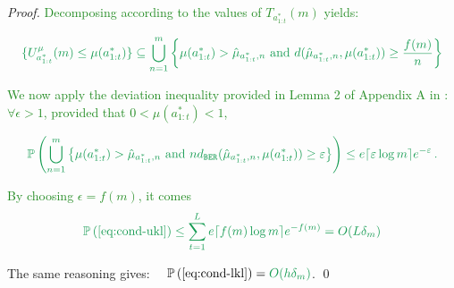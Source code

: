 \documentclass[runningheads, envcountsame, a4paper]{llncs}
\newcommand{\citep}{\cite}
\newcommand{\diff}[1]{\textcolor{ForestGreen}{#1}}
\begin{document}
\begin{proof}
\diff{Decomposing according to the values of $T_{a^*_{1:t}}(m)$ yields:}

\begin{equation*}
    \diff{\{U^{\mu}_{a^*_{1:t}}(m) \leq \mu(a^*_{1:t})\} \subseteq \bigcup_{n=1}^m \left\{ \mu(a^*_{1:t}) > \hat{\mu}_{a^*_{1:t}, n} \text{ and } d(\hat{\mu}_{a^*_{1:t}, n}, \mu(a^*_{1:t})) \geq \frac{f(m)}{n} \right\}}
\end{equation*}

\diff{We now apply the deviation inequality provided in Lemma 2 of Appendix A in \citep{Cappe2013}: $\forall \epsilon > 1$, provided that $0 < \mu(a^*_{1:t}) < 1$,}

\begin{equation*}
\diff{\probability{\bigcup_{n=1}^m \left\{ \mu(a^*_{1:t}) > \hat{\mu}_{a^*_{1:t}, n} \text{ and } n \dber(\hat{\mu}_{a^*_{1:t}, n}, \mu(a^*_{1:t})) \geq \epsilon \right\}} \leq e\ceil{\epsilon \log m}e^{-\epsilon}\,.}
\end{equation*}

\diff{By choosing $\epsilon = f(m)$, it comes}
\begin{align*}
    \diff{\probability{\eqref{eq:cond-ukl}} \leq \sum_{t=1}^L e\ceil{f(m)\log m}e^{-f(m)} = O(L\delta_m)}
\end{align*}

The same reasoning gives: $\quad\displaystyle{
    \probability{\eqref{eq:cond-lkl}} = \diff{O(h\delta_m)}}$.
\qed
\end{proof}
\end{document}
